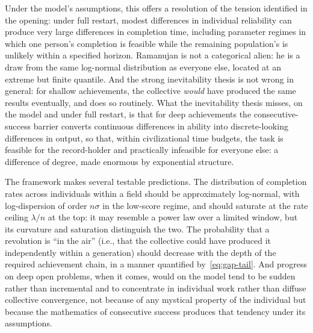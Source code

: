 \documentclass{article}
\begin{document}
Under the model's assumptions, this offers a resolution of the tension identified in the opening: under full restart, modest differences in individual reliability can produce very large differences in completion time, including parameter regimes in which one person's completion is feasible while the remaining population's is unlikely within a specified horizon. Ramanujan is
not a categorical alien: he is a draw from the same log-normal
distribution as everyone else, located at an extreme but finite
quantile. And the strong inevitability thesis is not wrong in
general: for shallow achievements, the collective \emph{would} have
produced the same results eventually, and does so routinely. What the inevitability thesis misses, on the model and under full restart, is that for deep achievements the consecutive-success barrier converts continuous differences in
ability into discrete-looking differences in output, so that, within civilizational time budgets, the task is feasible for the record-holder and practically infeasible for everyone else: a difference of degree, made enormous by exponential structure.

The framework makes several testable predictions. The distribution of completion rates across individuals within a field should be approximately log-normal, with log-dispersion of order $n\sigma$ in the low-score regime, and should saturate at the rate ceiling $\lambda/n$ at the top: it may resemble a power law over a limited window, but its curvature and saturation distinguish the two. The probability that a
revolution is ``in the air'' (i.e., that the collective could
have produced it independently within a generation) should decrease
with the depth of the required achievement chain, in a manner
quantified by~\eqref{eq:gap-tail}. And progress on deep open
problems, when it comes, would on the model tend to be sudden rather than incremental and to concentrate in individual work rather than diffuse collective convergence, not because of any mystical property of the individual but because the mathematics of consecutive success produces that tendency under its assumptions.
\end{document}
